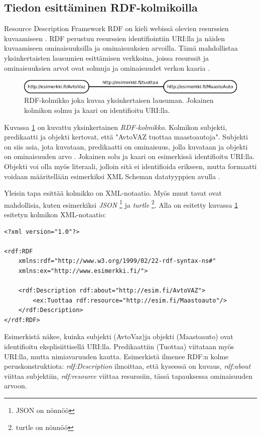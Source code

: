 \documentclass[finnish]{tktltiki2}
\theoremstyle{definition}
\theoremstyle{remark}
\begin{document}
\subsection{Tiedon esittäminen RDF-kolmikoilla}

Resource Description Framework RDF on kieli webissä olevien resurssien
kuvaamiseen \cite{RDFP}. 
RDF perustuu resurssien identifiointiin URI:lla ja näiden kuvaamiseen 
ominaisuuksilla ja ominaisuuksien arvoilla. Tämä mahdollistaa yksinkertaisten
lausumien esittämisen verkkoina, joissa resurssit ja ominaisuuksien arvot ovat solmuja ja
ominaisuudet verkon 
kaaria \cite{RDFP}. %

\begin{figure}[h]
 \centering
 \includegraphics[scale=0.50]{JackTorrance.png}
 \caption{RDF-kolmikko joka kuvaa yksinkertaisen lausuman. Jokainen kolmikon solmu
ja kaari on identifioitu URI:lla. }
 \label{jack}
\end{figure}

Kuvassa \ref{jack} on kuvattu yksinkertainen \textit{RDF-kolmikko}.
Kolmikon subjekti, predikaatti ja objekti kertovat, että "AvtoVAZ tuottaa maastoautoja". Subjekti on siis asia, jota kuvataan, predikaatti on ominaisuus, jolla 
kuvataan ja objekti on ominaisuuden arvo \cite{RDFP}. 
Jokainen solu ja kaari on esimerkissä identifioitu URI:lla. Objekti voi olla
myös literaali, jolloin 
sitä ei identifioida erikseen, mutta formaatti voidaan määritellään esimerkiksi XML Scheman
datatyyppien avulla \cite{RDFP}. 

Yleisin tapa esittää kolmikko on XML-notaatio. Myös muut tavat ovat mahdollisia,
kuten 
esimerkiksi \textit{JSON} \footnote{JSON on nönnöö} ja \textit{turtle} \footnote{turtle on nönnöö}. Alla on esitetty kuvassa
\ref{jack} esitetyn kolmikon XML-notaatio:
\begin{verbatim}
<?xml version="1.0"?>

<rdf:RDF
    xmlns:rdf="http://www.w3.org/1999/02/22-rdf-syntax-ns#"
    xmlns:ex="http://www.esimerkki.fi/">
    
    <rdf:Description rdf:about="http://esim.fi/AvtoVAZ">
        <ex:Tuottaa rdf:resource="http://esim.fi/Maastoauto"/>
    </rdf:Description>
</rdf:RDF>
\end{verbatim}
Esimerkistä näkee, kuinka subjekti (AvtoVaz)ja objekti (Maastoauto) ovat
identifioitu eksplisiittisellä URI:lla. Predikaattiin (Tuottaa) viitataan myös URI:lla, mutta
nimiavaruuden kautta. Esimerkistä ilmenee RDF:n kolme peruskonstruktiota:  
\textit{rdf:Description} ilmoittaa, että kyseessä on kuvaus, \textit{rdf:about} viittaa subjektiin, \textit{rdf:resource}
viittaa resurssiin, tässä tapauksessa ominaisuuden arvoon. 
\end{document}
